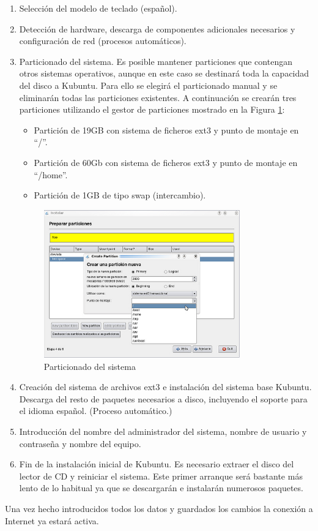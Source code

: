 \begin{enumerate}
\item Selección del modelo de teclado (español).

\item Detección de hardware, descarga de componentes adicionales necesarios y configuración de red (procesos automáticos).

\item Particionado del sistema. Es posible mantener particiones que contengan otros sistemas operativos, aunque en este caso se destinará toda la capacidad del disco a Kubuntu. Para ello se elegirá el particionado manual y se eliminarán todas las particiones existentes. A continuación se crearán tres particiones utilizando el gestor de particiones mostrado en la Figura \ref{fig:particionado}:
\begin{itemize}
 \item Partición de 19GB con sistema de ficheros ext3 y punto de montaje en ``/''.
 \item Partición de 60Gb con sistema de ficheros ext3 y punto de montaje en ``/home''.
 \item Partición de  1GB de tipo swap (intercambio).
\end{itemize}

\begin{figure}[htb!]
 \centering
 \includegraphics[width=0.8\textwidth]{Utils/particionado.png}
 \caption{Particionado del sistema}
 \label{fig:particionado}
\end{figure}

\item Creación del sistema de archivos ext3 e instalación del sistema base Kubuntu. Descarga del resto de paquetes necesarios a disco, incluyendo el soporte para el idioma español. (Proceso automático.)

\item Introducción del nombre del administrador del sistema, nombre de usuario y contraseña y nombre del equipo.

\item Fin de la instalación inicial de Kubuntu. Es necesario extraer el disco del lector de CD y reiniciar el sistema. Este primer arranque será bastante más lento de lo habitual ya que se descargarán e instalarán numerosos paquetes.
\end{enumerate}

\newpage
Una vez hecho introducidos todos los datos y guardados los cambios la conexión a
Internet ya estará activa.